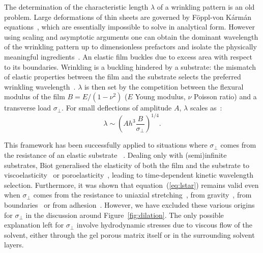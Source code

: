 \documentclass[twocolumn,superscriptaddress,showpacs,preprintnumbers,
amsmath,amssymb,prl]{revtex4-1}
\begin{document}

The determination of the characteristic length $\lambda$ of a wrinkling pattern is an old problem. Large deformations of thin sheets are governed by F\"{o}ppl-von K\'arm\'an equations~\cite{landau1986}, which are essentially impossible to solve in analytical form. However using scaling and asymptotic arguments one can obtain the dominant wavelength of the wrinkling pattern up to dimensionless prefactors and isolate the physically meaningful ingredients~\cite{Cerda2003}. An elastic film buckles due to excess area with respect to its boundaries. Wrinkling is a buckling hindered by a substrate: the mismatch of elastic properties between the film and the substrate selects the preferred wrinkling wavelength~\cite{Gough1940, Bijlaard1946}. $\lambda$ is then set by the competition between the flexural modulus of the film $B=E/(1-\nu^2)$ ($E$ Young modulus, $\nu$ Poisson ratio) and a transverse load $\sigma_\perp$. For small deflections of  amplitude $A$, $\lambda$ scales as~\cite{Vella2009,Kolinski2009}: 
%
\begin{equation}
\lambda \sim \left( A h^3 \frac{B}{\sigma_{\perp}} \right)^{1/4}.
\label{eq:lstar}
\end{equation}



This framework has been successfully applied to situations where $\sigma_{\perp}$ comes from the resistance of an elastic substrate ~\cite{Gough1940, Bijlaard1946}. Dealing only with (semi)infinite substrates, Biot generalised the elasticity of both the film and the substrate to viscoelasticity~\cite{Biot1957} or poroelasticity~\cite{Biot1964}, leading to time-dependent kinetic wavelength selection. Furthermore, it was shown that equation~(\ref{eq:lstar}) remains valid even when $\sigma_{\perp}$ comes from the resistance to uniaxial stretching~\cite{Cerda2003}, from gravity~\cite{Smoluchowski1910, Kolinski2009, Vella2009, Pineirua2013, Lucantonio2013}, from boundaries~\cite{Vandeparre2011a, Li2013} or from adhesion~\cite{Vella2009a}. However, we have excluded these various origins for $\sigma_{\perp}$ in the discussion around Figure~\ref{fig:dilation}.
%
The only possible explanation left for $\sigma_{\perp}$ involve hydrodynamic stresses due to viscous flow of the solvent, either through the gel porous matrix itself or in the surrounding solvent layers.
\end{document}

